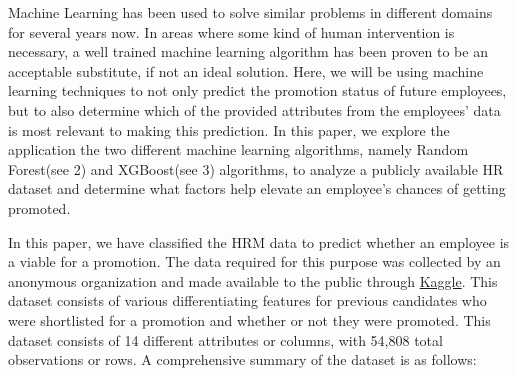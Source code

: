 \documentclass[runningheads]{llncs}
\begin{document}
Machine Learning has been used to solve similar problems in different
domains for several years now. In areas where some kind of human
intervention is necessary, a well trained machine learning algorithm has
been proven to be an acceptable substitute, if not an ideal solution.
Here, we will be using machine learning techniques to not only predict
the promotion status of future employees, but to also determine which of
the provided attributes from the employees' data is most relevant to
making this prediction. In this paper, we explore the application the
two different machine learning algorithms, namely Random Forest(see
\cite{ref-Breiman2001}{2}) and XGBoost(see
\cite{ref-ChenG16}{3}) algorithms, to analyze a
publicly available HR dataset and determine what factors help elevate an
employee's chances of getting promoted.

In this paper, we have classified the HRM data to predict whether an
employee is a viable for a promotion. The data required for this purpose
was collected by an anonymous organization and made available to the
public through \href{https://www.kaggle.com}{Kaggle}. This dataset
consists of various differentiating features for previous candidates who
were shortlisted for a promotion and whether or not they were promoted.
This dataset consists of 14 different attributes or columns, with 54,808
total observations or rows. A comprehensive summary of the dataset is as
follows:
\end{document}

